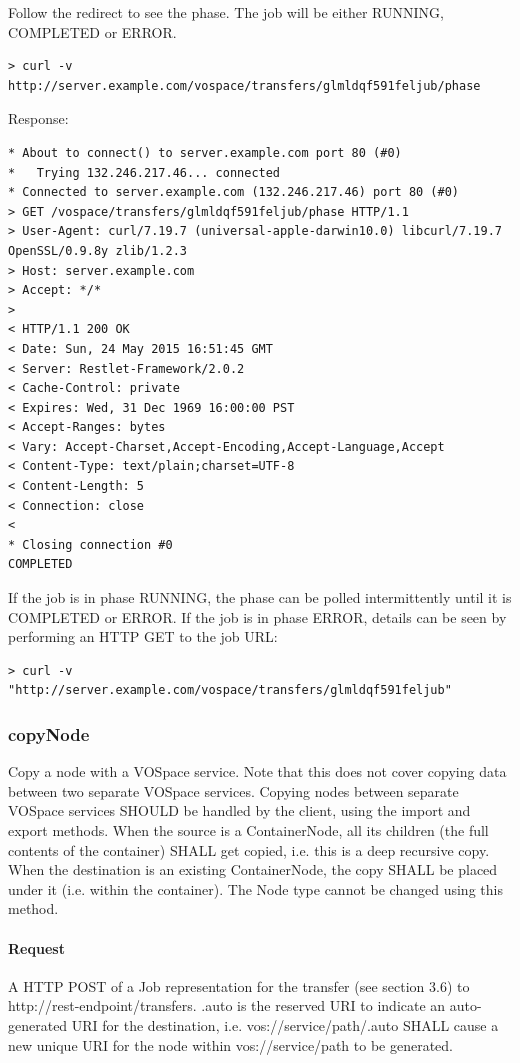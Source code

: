 \documentclass[11pt,a4paper]{ivoa}
\begin{document}
Follow the redirect to see the phase.  The job will be either RUNNING, COMPLETED or ERROR.
\begin{lstlisting}
> curl -v http://server.example.com/vospace/transfers/glmldqf591feljub/phase
\end{lstlisting}
Response:
\begin{lstlisting}
* About to connect() to server.example.com port 80 (#0)
*   Trying 132.246.217.46... connected
* Connected to server.example.com (132.246.217.46) port 80 (#0)
> GET /vospace/transfers/glmldqf591feljub/phase HTTP/1.1
> User-Agent: curl/7.19.7 (universal-apple-darwin10.0) libcurl/7.19.7 OpenSSL/0.9.8y zlib/1.2.3
> Host: server.example.com
> Accept: */*
>
< HTTP/1.1 200 OK
< Date: Sun, 24 May 2015 16:51:45 GMT
< Server: Restlet-Framework/2.0.2
< Cache-Control: private
< Expires: Wed, 31 Dec 1969 16:00:00 PST
< Accept-Ranges: bytes
< Vary: Accept-Charset,Accept-Encoding,Accept-Language,Accept
< Content-Type: text/plain;charset=UTF-8
< Content-Length: 5
< Connection: close
<
* Closing connection #0
COMPLETED
\end{lstlisting}
If the job is in phase RUNNING, the phase can be polled intermittently until it is COMPLETED or ERROR.
If the job is in phase ERROR, details can be seen by performing an HTTP GET to the job URL:
\begin{lstlisting}
> curl -v "http://server.example.com/vospace/transfers/glmldqf591feljub"
\end{lstlisting}

\subsubsection{copyNode}
\label{subsubsec:copynode}
Copy a node with a VOSpace service.
Note that this does not cover copying data between two separate VOSpace services.
Copying nodes between separate VOSpace services SHOULD be handled by the client, using the import and export methods.
When the source is a ContainerNode, all its children (the full contents of the container) SHALL get copied, i.e. this is a deep recursive copy.
When the destination is an existing ContainerNode, the copy SHALL be placed under it (i.e. within the container).
The Node type cannot be changed using this method.

\paragraph{Request}
A HTTP POST of a Job representation for the transfer (see section 3.6) to http://rest-endpoint/transfers.
.auto is the reserved URI to indicate an auto-generated URI for the destination, i.e. vos://service/path/.auto SHALL cause a new unique URI for the node within vos://service/path to be generated.
\end{document}
